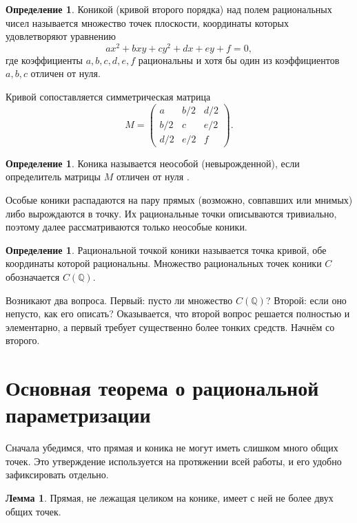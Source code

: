 \documentclass[a4paper,14pt]{extreport}
\theoremstyle{definition}
\newtheorem{lem}[thm]{Лемма}
\newtheorem{defn}[thm]{Определение}
\newcommand{\Q}{\mathbb{Q}}
\begin{document}
\begin{defn}
Коникой (кривой второго порядка) над полем рациональных чисел называется
множество точек плоскости, координаты которых удовлетворяют уравнению
\begin{equation}\label{eq:conic}
  ax^2+bxy+cy^2+dx+ey+f=0,
\end{equation}
где коэффициенты $a,b,c,d,e,f$ рациональны и хотя бы один из коэффициентов
$a,b,c$ отличен от нуля.
\end{defn}

Кривой сопоставляется симметрическая матрица
\[
  M=\begin{pmatrix}
     a & b/2 & d/2\\
     b/2 & c & e/2\\
     d/2 & e/2 & f
    \end{pmatrix}.
\]

\begin{defn}\label{def:nonsing}
Коника называется неособой (невырожденной), если определитель матрицы $M$
отличен от нуля \cite[с.~118]{atanasyan}.
\end{defn}

Особые коники распадаются на пару прямых (возможно, совпавших или мнимых) либо
вырождаются в точку. Их рациональные точки описываются тривиально, поэтому
далее рассматриваются только неособые коники.

\begin{defn}
Рациональной точкой коники называется точка кривой, обе координаты которой
рациональны. Множество рациональных точек коники $C$ обозначается $C(\Q)$.
\end{defn}

Возникают два вопроса. Первый: пусто ли множество $C(\Q)$? Второй: если оно
непусто, как его описать? Оказывается, что второй вопрос решается полностью и
элементарно, а первый требует существенно более тонких средств. Начнём со
второго.

\section{Основная теорема о рациональной параметризации}

Сначала убедимся, что прямая и коника не могут иметь слишком много общих точек.
Это утверждение используется на протяжении всей работы, и его удобно
зафиксировать отдельно.

\begin{lem}\label{lem:two}
Прямая, не лежащая целиком на конике, имеет с ней не более двух общих точек.
\end{lem}
\end{document}

